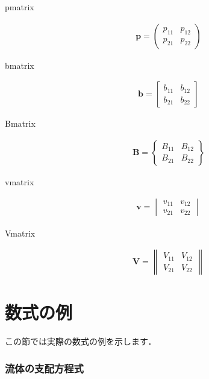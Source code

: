 \documentclass[11pt,a4j,onecolumn]{jsreport} %
\begin{document}
\begin{description}
  \item[pmatrix] 
    \begin{align*}
      {\bm p} = 
      \begin{pmatrix}
        p_{11} & p_{12} \\
        p_{21} & p_{22} 
      \end{pmatrix}
    \end{align*}
  \item[bmatrix] 
    \begin{align*}
      {\bm b} = 
      \begin{bmatrix}
        b_{11} & b_{12} \\
        b_{21} & b_{22} 
      \end{bmatrix}
    \end{align*}
  \item[Bmatrix] 
    \begin{align*}
      {\bm B} = 
      \begin{Bmatrix}
        B_{11} & B_{12} \\
        B_{21} & B_{22} 
      \end{Bmatrix}
    \end{align*}
  \item[vmatrix] 
    \begin{align*}
      {\bm v} = 
      \begin{vmatrix}
        v_{11} & v_{12} \\
        v_{21} & v_{22} 
      \end{vmatrix}
    \end{align*}
  \item[Vmatrix] 
    \begin{align*}
      {\bm V} = 
      \begin{Vmatrix}
        V_{11} & V_{12} \\
        V_{21} & V_{22} 
      \end{Vmatrix}
    \end{align*}
\end{description}

\section{数式の例}

この節では実際の数式の例を示します．

\subsubsection{流体の支配方程式}
\end{document}
